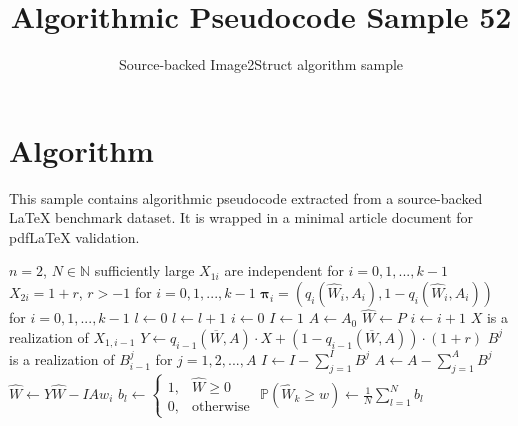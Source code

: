 \documentclass[11pt]{article}
\title{Algorithmic Pseudocode Sample 52}
\author{Source-backed Image2Struct algorithm sample}
\date{}
\begin{document}
\maketitle
\section{Algorithm}
This sample contains algorithmic pseudocode extracted from a source-backed LaTeX benchmark dataset. It is wrapped in a minimal article document for pdfLaTeX validation.

\begin{algorithm}[htbp]
\caption{Source-backed algorithmic procedure}
\begin{algorithmic}
\Require $n=2$, $N\in\mathbb{N}$ sufficiently large
\Require $X_{1i}$ are independent for $i=0,1,...,k-1$
\Require $X_{2i}=1+r$, $r>-1$ for $i=0,1,...,k-1$
\Require $\boldsymbol\pi_{i}=(q_i(\widehat{W}_i,A_i),1-q_i(\widehat{W}_i,A_i))$ for $i=0,1,...,k-1$
\State $l\gets 0$
\State $l\gets l+1$
\State $i\gets 0$ 
\State $I\gets 1$ 
\State $A\gets A_0$ 
\State $\widehat{W}\gets P$ 
\State $i\gets i+1$
\State $X$ is a realization of $X_{1,i-1}$
\State $Y\gets q_{i-1}(\overline{W},A)\cdot X+(1-q_{i-1}(\overline{W},A))\cdot (1+r)$
\State $B^j$ is a realization of $B_{i-1}^j$ for $j=1,2,...,A$
\State $I\gets I-\sum_{j=1}^IB^j$
\State $A\gets A-\sum_{j=1}^AB^j$
\State $\widehat{W}\gets Y\widehat{W}-IAw_i$ 
\EndWhile
\State $b_l\gets\begin{cases}
1,&\widehat{W}\geq 0\\0,&\text{otherwise}\end{cases}$
\EndWhile
\State $\mathbb{P}(\widehat{W}_k\geq w)\gets\frac{1}{N}\sum_{l=1}^Nb_l$\\
\end{algorithmic}
\end{algorithm}
\end{document}
